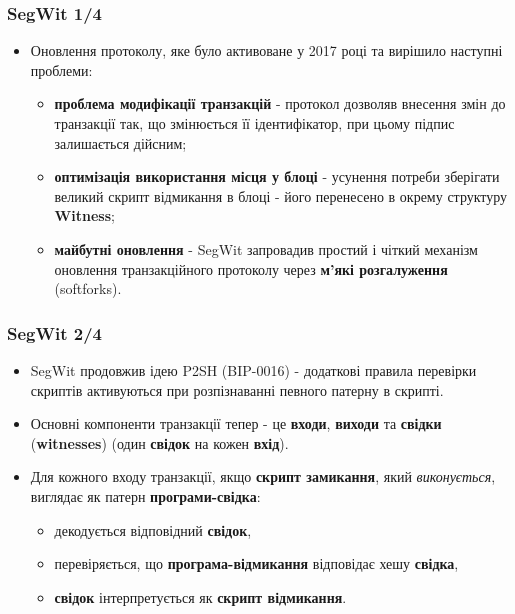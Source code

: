 \documentclass{beamer}
\begin{document}
\begin{frame}
  \frametitle{SegWit 1/4}
  \begin{itemize}
  \item Оновлення протоколу, яке було активоване у 2017 році та вирішило
    наступні проблеми:
    \begin{itemize}
    \item \textbf{проблема модифікації транзакцій} - протокол дозволяв внесення
      змін до транзакції так, що змінюється її ідентифікатор, при цьому підпис
      залишається дійсним;
    \item \textbf{оптимізація використання місця у блоці} - усунення потреби
      зберігати великий скрипт відмикання в блоці - його перенесено в окрему
      структуру \textbf{Witness};
    \item \textbf{майбутні оновлення} - SegWit запровадив простий і чіткий
      механізм оновлення транзакційного протоколу через \textbf{м'які
        розгалуження} (softforks).
    \end{itemize}
  \end{itemize}
\end{frame}

\begin{frame}
  \frametitle{SegWit 2/4}
  \begin{itemize}
  \item SegWit продовжив ідею P2SH (BIP-0016) - додаткові правила перевірки
    скриптів активуються при розпізнаванні певного патерну в скрипті.
  \item Основні компоненти транзакції тепер - це \textbf{входи}, \textbf{виходи}
    та \textbf{свідки} (\textbf{witnesses}) (один \textbf{свідок} на кожен
    \textbf{вхід}).
  \item Для кожного входу транзакції, якщо \textbf{скрипт замикання}, який
    \textit{виконується}, виглядає як патерн \textbf{програми-свідка}:
    \begin{itemize}
    \item декодується відповідний \textbf{свідок},
    \item перевіряється, що \textbf{програма-відмикання} відповідає хешу
      \textbf{свідка},
    \item \textbf{свідок} інтерпретується як \textbf{скрипт відмикання}.
    \end{itemize}
  \end{itemize}
\end{frame}
\end{document}
